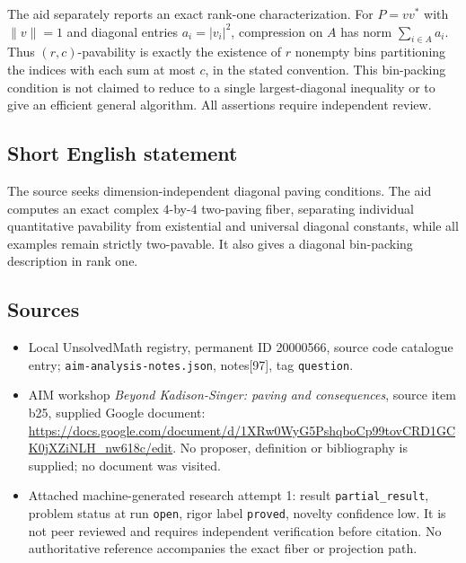 \documentclass[11pt]{article}
\begin{document}
The aid separately reports an exact rank-one characterization. For $P=vv^*$ with $\|v\|=1$ and diagonal entries $a_i=|v_i|^2$, compression on $A$ has norm $\sum_{i\in A}a_i$. Thus $(r,c)$-pavability is exactly the existence of $r$ nonempty bins partitioning the indices with each sum at most $c$, in the stated convention. This bin-packing condition is not claimed to reduce to a single largest-diagonal inequality or to give an efficient general algorithm. All assertions require independent review.
\subsection{Short English statement}
The source seeks dimension-independent diagonal paving conditions. The aid computes an exact complex $4$-by-$4$ two-paving fiber, separating individual quantitative pavability from existential and universal diagonal constants, while all examples remain strictly two-pavable. It also gives a diagonal bin-packing description in rank one.
\subsection{Sources}
\begin{itemize}
\item Local UnsolvedMath registry, permanent ID 20000566, source code catalogue entry; \texttt{aim-analysis-notes.json}, notes[97], tag \texttt{question}.
\item AIM workshop \emph{Beyond Kadison-Singer: paving and consequences}, source item b25, supplied Google document: \url{https://docs.google.com/document/d/1XRw0WyG5PshqboCp99tovCRD1GCK0jXZiNLH_nw618c/edit}. No proposer, definition or bibliography is supplied; no document was visited.
\item Attached machine-generated research attempt 1: result \texttt{partial\_result}, problem status at run \texttt{open}, rigor label \texttt{proved}, novelty confidence low. It is not peer reviewed and requires independent verification before citation. No authoritative reference accompanies the exact fiber or projection path.
\end{itemize}
\end{document}
